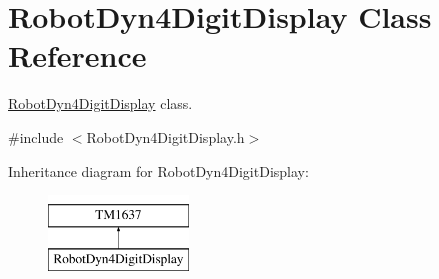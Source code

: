 \hypertarget{class_robot_dyn4_digit_display}{}\section{Robot\+Dyn4\+Digit\+Display Class Reference}
\label{class_robot_dyn4_digit_display}


\hyperlink{class_robot_dyn4_digit_display}{Robot\+Dyn4\+Digit\+Display} class.  




{\ttfamily \#include $<$Robot\+Dyn4\+Digit\+Display.\+h$>$}

Inheritance diagram for Robot\+Dyn4\+Digit\+Display\+:\begin{figure}[H]
\begin{center}
\leavevmode
\includegraphics[height=2.000000cm]{class_robot_dyn4_digit_display}
\end{center}
\end{figure}
